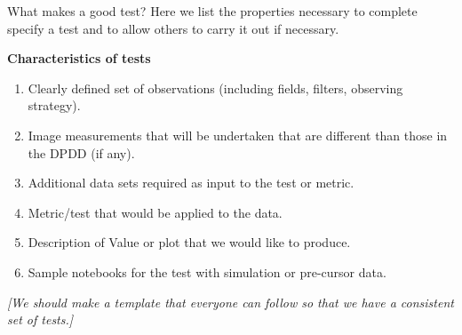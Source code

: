 \documentclass[modern]{desc-tex/styles/lsstdescnote}
\begin{document}
What makes a good test?  Here we list the properties necessary to complete specify a test and to allow others to carry it out if necessary.

{\bf Characteristics of tests }
\begin{enumerate}
\item Clearly defined set of observations (including fields, filters, observing strategy).
\item Image measurements that will be undertaken that are different than those in the DPDD (if any).
\item Additional data sets required as input to the test or metric.
\item Metric/test that would be applied to the data.
\item Description of Value or plot  that we would like to produce.
\item Sample notebooks for the test with simulation or pre-cursor data.
\end{enumerate}

{\it [We should make a template that everyone can follow so that we have a consistent set of tests.]}

\begin{acknowledgments}

\end{acknowledgments}


\end{document}
